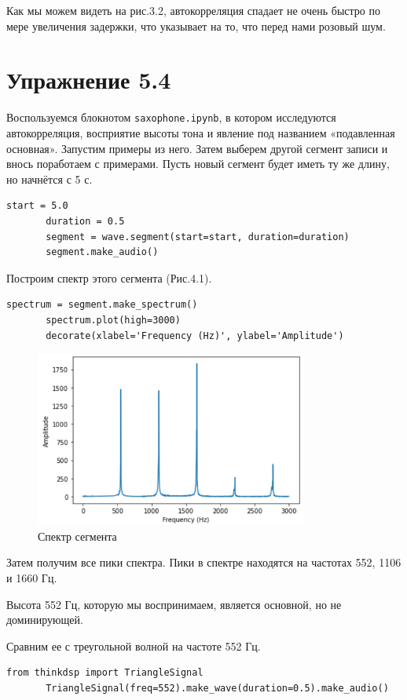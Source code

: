 \documentclass[a4paper,12pt]{report}
\begin{document}
     Как мы можем видеть на рис.3.2, автокорреляция спадает не очень быстро по мере увеличения задержки, что указывает на то, что перед нами розовый шум.
 
\chapter{Упражнение 5.4}
    Воспользуемся блокнотом \texttt{saxophone.ipynb}, в котором исследуются автокорреляция, восприятие высоты тона и явление под названием «подавленная основная». Запустим примеры из него. Затем выберем другой сегмент записи и внось поработаем с примерами.
    Пусть новый сегмент будет иметь ту же длину, но начнётся с 5 с.
\begin{lstlisting}[caption=Выделение сегмента]
       start = 5.0
       duration = 0.5
       segment = wave.segment(start=start, duration=duration)
       segment.make_audio()
\end{lstlisting} 

    Построим спектр этого сегмента (Рис.4.1).
\begin{lstlisting}[caption=Построение спектра сегмента]
       spectrum = segment.make_spectrum()
       spectrum.plot(high=3000)
       decorate(xlabel='Frequency (Hz)', ylabel='Amplitude')
\end{lstlisting}
\begin{figure}[H]
        \centering
        \includegraphics[width=0.8\textwidth]{fig4-1.PNG}
        \caption{Спектр сегмента}
        \label{fig:fig4-1}
\end{figure}

    Затем получим все пики спектра. Пики в спектре находятся на частотах 552, 1106 и 1660 Гц.                    
    
    Высота 552 Гц, которую мы воспринимаем, является основной, но не доминирующей.

    Сравним ее с треугольной волной на частоте 552 Гц.
\begin{lstlisting}[caption=Получение треугольной волны]
       from thinkdsp import TriangleSignal
       TriangleSignal(freq=552).make_wave(duration=0.5).make_audio()
\end{lstlisting}
\end{document}
